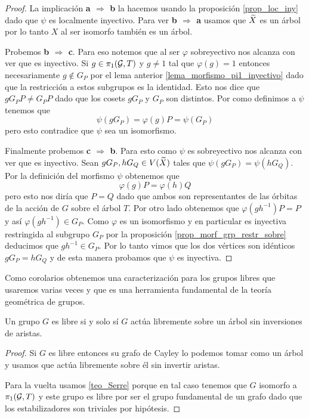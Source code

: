 \documentclass[tesis.tex]{subfiles}
\begin{document}
\begin{proof}	
		 La implicación \textbf{a $\Rightarrow$ b} la hacemos usando la proposición \ref{prop_loc_iny} dado que $\psi$ es localmente inyectivo.
		 Para ver \textbf{b $\Rightarrow$ a} usamos que $\widetilde X$ es un árbol por lo tanto $X$ al ser isomorfo también es un árbol.
		 
		 Probemos \textbf{b $\Rightarrow$ c}. 
		 Para eso notemos que al ser $\varphi$ sobreyectivo nos alcanza con ver que es inyectivo.
		 Si $g \in \pi_1({\cal G}, T)$ y $g \neq 1$ tal que $\varphi(g)= 1$ entonces necesariamente $g \notin G_P$ por el lema anterior \ref{lema_morfismo_pi1_inyectivo} dado que la restricción a estos subgrupos es la identidad.
		 Esto nos dice que $g G_P P \neq G_P P$ dado que los cosets $gG_P$ y $G_P$ son distintos. Por como definimos a $\psi$ tenemos que 
		 \[
		 \psi (gG_P ) = \varphi(g) P  = \psi(G_P )
		 \] 
		 pero esto contradice que $\psi$ sea un isomorfismo.
		 
		 Finalmente probemos \textbf{c $\Rightarrow$ b}. 
		 Para esto como $\psi$ es sobreyectivo nos alcanza con ver que es inyectivo.
		 Sean $gG_P, hG_Q \in V(\widetilde X)$ tales que $\psi(gG_P) = \psi(hG_Q)$.
		 Por la definición del morfismo $\psi$ obtenemos que 
		 \[
		 	\varphi(g)P = \varphi(h)Q
		 \]
		 pero esto nos diría que $P = Q$ dado que ambos son representantes de las órbitas de la acción de $G$ sobre el árbol $T$. 
		 Por otro lado obtenemos que $\varphi(g h^{-1}) P  =  P$ y así $\varphi(gh^{-1}) \in G_P$. 
		 Como $\varphi$ es un isomorfismo y en particular es inyectiva restringida al subgrupo $G_P$ por la proposición \ref{prop_morf_grp_restr_sobre} deducimos que $gh^{-1} \in G_P$.
		 Por lo tanto vimos que los dos vértices son idénticos $gG_P  = hG_Q$ y de esta manera probamos que $\psi$ es inyectiva.
\end{proof}

Como corolarios obtenemos una caracterización para los grupos libres que usaremos varias veces y que es una herramienta fundamental de la teoría geométrica de grupos.

\begin{coro}\label{coro_libre_sii_actua_arbol}
	Un grupo $G$ es libre si y solo sí $G$ actúa libremente sobre un árbol sin inversiones de aristas. 
\end{coro}
\begin{proof}
	Si $G$ es libre entonces su grafo de Cayley lo podemos tomar como un árbol y usamos que actúa libremente sobre él sin invertir aristas.
	
	Para la vuelta usamos \ref{teo_Serre} porque en tal caso tenemos que $G$ isomorfo a $\pi_1({\cal G}, T)$ y este grupo es libre por ser el grupo fundamental de un grafo dado que los estabilizadores son triviales por hipótesis.
\end{proof}
\end{document}
